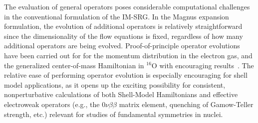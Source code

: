 The evaluation of general operators poses considerable computational
challenges in the conventional formulation of the IM-SRG. In the
Magnus expansion formulation, the evolution of additional operators is
relatively straightforward since the dimensionality of the flow
equations is fixed, regardless of how many additional operators are
being evolved. Proof-of-principle operator evolutions have been
carried out for for the momentum distribution in the electron gas, and
the generalized center-of-mass Hamiltonian in $^{16}$O with encouraging
results~\cite{Morris:2015ve}.  The relative ease of performing
operator evolution is especially encouraging for shell model
applications, as it opens up the exciting possibility for consistent,
nonperturbative calculations of both Shell-Model Hamiltonians and
effective electroweak operators (e.g., the $0\nu\beta\beta$ matrix
element, quenching of Gamow-Teller strength, etc.) relevant for
studies of fundamental symmetries in nuclei.




